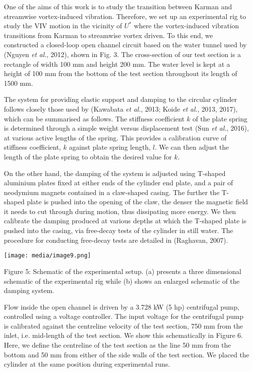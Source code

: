 \documentclass[]{article}
\begin{document}
One of the aims of this work is to study the transition between Karman
and streamwise vortex-induced vibration. Therefore, we set up an
experimental rig to study the VIV motion in the vicinity of \(U^{*}\)
where the vortex-induced vibration transitions from Karman to streamwise
vortex driven. To this end, we constructed a closed-loop open channel
circuit based on the water tunnel used by (Nguyen \emph{et al.}, 2012),
shown in Fig. 3. The cross-section of our test section is a rectangle of
width 100 mm and height 200 mm. The water level is kept at a height of
100 mm from the bottom of the test section throughout its length of 1500
mm.

The system for providing elastic support and damping to the circular
cylinder follows closely those used by (Kawabata \emph{et al.}, 2013;
Koide \emph{et al.}, 2013, 2017), which can be summarised as follows.
The stiffness coefficient \(k\) of the plate spring is determined
through a simple weight versus displacement test (Sun \emph{et al.},
2016), at various active lengths of the spring. This provides a
calibration curve of stiffness coefficient, \(k\) against plate spring
length, \(l\). We can then adjust the length of the plate spring to
obtain the desired value for \(k\).

On the other hand, the damping of the system is adjusted using T-shaped
aluminium plates fixed at either ends of the cylinder end plate, and a
pair of neodymium magnets contained in a claw-shaped casing. The further
the T-shaped plate is pushed into the opening of the claw, the denser
the magnetic field it needs to cut through during motion, thus
dissipating more energy. We then calibrate the damping produced at
various depths at which the T-shaped plate is pushed into the casing,
via free-decay tests of the cylinder in still water. The procedure for
conducting free-decay tests are detailed in (Raghavan, 2007).

\texttt{[image: media/image9.png]}

\protect\hypertarget{_Toc41048828}{}{}Figure 5: Schematic of the
experimental setup. (a) presents a three dimensional schematic of the
experimental rig while (b) shows an enlarged schematic of the damping
system.

Flow inside the open channel is driven by a 3.728 kW (5 hp) centrifugal
pump, controlled using a voltage controller. The input voltage for the
centrifugal pump is calibrated against the centreline velocity of the
test section, 750 mm from the inlet, i.e. mid-length of the test
section. We show this schematically in Figure 6. Here, we define the
centreline of the test section as the line 50 mm from the bottom and 50
mm from either of the side walls of the test section. We placed the
cylinder at the same position during experimental runs.
\end{document}
